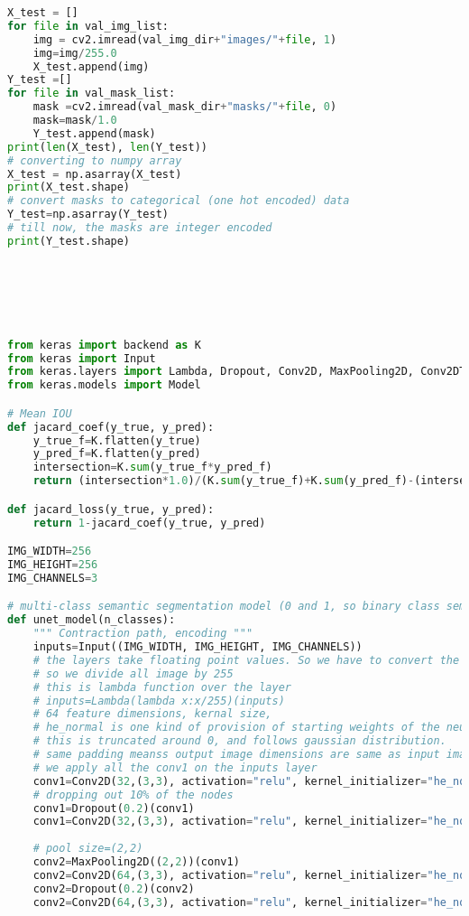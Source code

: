 \begin{lstlisting}[language=Python]
X_test = []
for file in val_img_list:
    img = cv2.imread(val_img_dir+"images/"+file, 1)
    img=img/255.0
    X_test.append(img)
Y_test =[]
for file in val_mask_list:
    mask =cv2.imread(val_mask_dir+"masks/"+file, 0)
    mask=mask/1.0
    Y_test.append(mask)
print(len(X_test), len(Y_test))
# converting to numpy array
X_test = np.asarray(X_test)
print(X_test.shape)
# convert masks to categorical (one hot encoded) data
Y_test=np.asarray(Y_test)
# till now, the masks are integer encoded
print(Y_test.shape)






from keras import backend as K
from keras import Input
from keras.layers import Lambda, Dropout, Conv2D, MaxPooling2D, Conv2DTranspose, concatenate
from keras.models import Model

# Mean IOU
def jacard_coef(y_true, y_pred):
    y_true_f=K.flatten(y_true)
    y_pred_f=K.flatten(y_pred)
    intersection=K.sum(y_true_f*y_pred_f)
    return (intersection*1.0)/(K.sum(y_true_f)+K.sum(y_pred_f)-(intersection*1.0))

def jacard_loss(y_true, y_pred):
    return 1-jacard_coef(y_true, y_pred)

IMG_WIDTH=256
IMG_HEIGHT=256
IMG_CHANNELS=3

# multi-class semantic segmentation model (0 and 1, so binary class semantic segmentation)
def unet_model(n_classes):
    """ Contraction path, encoding """
    inputs=Input((IMG_WIDTH, IMG_HEIGHT, IMG_CHANNELS))
    # the layers take floating point values. So we have to convert the integers of the pixel values to floating point
    # so we divide all image by 255
    # this is lambda function over the layer
    # inputs=Lambda(lambda x:x/255)(inputs)
    # 64 feature dimensions, kernal size, 
    # he_normal is one kind of provision of starting weights of the neural network. In the process of iteration, the weights get better.
    # this is truncated around 0, and follows gaussian distribution.
    # same padding meanss output image dimensions are same as input image
    # we apply all the conv1 on the inputs layer
    conv1=Conv2D(32,(3,3), activation="relu", kernel_initializer="he_normal", padding="same")(inputs)
    # dropping out 10% of the nodes
    conv1=Dropout(0.2)(conv1)
    conv1=Conv2D(32,(3,3), activation="relu", kernel_initializer="he_normal", padding="same")(conv1)
    
    # pool size=(2,2)
    conv2=MaxPooling2D((2,2))(conv1)
    conv2=Conv2D(64,(3,3), activation="relu", kernel_initializer="he_normal", padding="same")(conv2)
    conv2=Dropout(0.2)(conv2)
    conv2=Conv2D(64,(3,3), activation="relu", kernel_initializer="he_normal", padding="same")(conv2)
    

\end{lstlisting}

